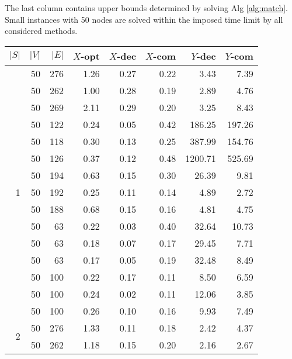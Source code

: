 The last column contains upper bounds determined by solving Alg \ref{alg:match}.
Small instances with 50 nodes are solved within the imposed time limit by all considered methods. 
\begin{table}[]
\begin{tabular}{rrrrrrrr}
$|S|$               & $|V|$ & $|E|$ & $X$-opt & $X$-dec & $X$-com & $Y$-dec & $Y$-com \\\hline
\multirow{15}{*}{1} & 50    & 276   & 1.26    & 0.27    & 0.22    & 3.43    & 7.39    \\
                    & 50    & 262   & 1.00    & 0.28    & 0.19    & 2.89    & 4.76    \\
                    & 50    & 269   & 2.11    & 0.29    & 0.20    & 3.25    & 8.43    \\
                    & 50    & 122   & 0.24    & 0.05    & 0.42    & 186.25  & 197.26  \\
                    & 50    & 118   & 0.30    & 0.13    & 0.25    & 387.99  & 154.76  \\
                    & 50    & 126   & 0.37    & 0.12    & 0.48    & 1200.71 & 525.69  \\
                    & 50    & 194   & 0.63    & 0.15    & 0.30    & 26.39   & 9.81    \\
                    & 50    & 192   & 0.25    & 0.11    & 0.14    & 4.89    & 2.72    \\
                    & 50    & 188   & 0.68    & 0.15    & 0.16    & 4.81    & 4.75    \\
                    & 50    & 63    & 0.22    & 0.03    & 0.40    & 32.64   & 10.73   \\
                    & 50    & 63    & 0.18    & 0.07    & 0.17    & 29.45   & 7.71    \\
                    & 50    & 63    & 0.17    & 0.05    & 0.19    & 32.48   & 8.49    \\
                    & 50    & 100   & 0.22    & 0.17    & 0.11    & 8.50    & 6.59    \\
                    & 50    & 100   & 0.24    & 0.02    & 0.11    & 12.06   & 3.85    \\
                    & 50    & 100   & 0.26    & 0.10    & 0.16    & 9.93    & 7.49    \\\hline
\multirow{15}{*}{2} & 50    & 276   & 1.33    & 0.11    & 0.18    & 2.42    & 4.37    \\
                    & 50    & 262   & 1.18    & 0.15    & 0.20    & 2.16    & 2.67    \\

\end{tabular}
\end{table}

